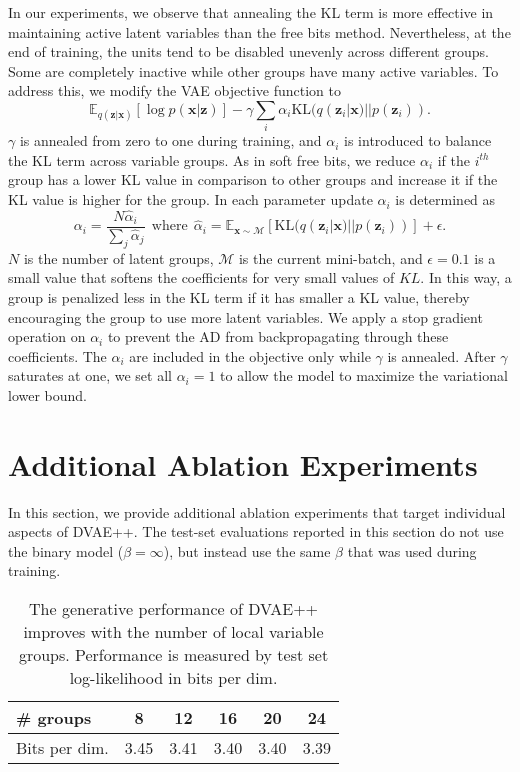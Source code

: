 \documentclass{article}
\newcommand{\x}{{\pmb{x}}}
\newcommand{\z}{{\pmb{z}}}
\newcommand{\E}{{\mathbb{E}}}
\def\KL{\text{KL}}
\begin{document}
In our experiments, we observe that annealing the KL term is more effective in maintaining active latent
variables than the free bits method. Nevertheless, at the end of training, the units tend to be
disabled unevenly across different groups. Some are completely inactive while other groups have many active variables. To address this, 
we modify the VAE objective function to
\begin{equation*}
\E_{q(\z|\x)}\left[ \log p(\x|\z)  \right] - \gamma \sum_i \alpha_i \KL(q(\z_{i}|\x) || p(\z_{i})).
\end{equation*}
$\gamma$ is annealed from zero to one during training, and $\alpha_i$ is introduced to balance the KL term across variable groups. 
As in soft free bits,
we reduce $\alpha_i$ if the $i^{th}$ group has a lower KL value in comparison to other groups and increase it if the KL value is higher for the group. 
In each parameter update $\alpha_i$ is determined as
\begin{equation*}
\alpha_i = \frac{N \hat{\alpha}_i}{\sum_j \hat{\alpha}_j} \ \ \text{where} \ \ \hat{\alpha}_i =  \E_{\x \sim \mathcal{M}} [\KL(q(\z_{i}|\x) || p(\z_{i}))] +\epsilon.
\end{equation*}
$N$ is the number of latent groups, $\mathcal{M}$ is the current mini-batch, and $\epsilon=0.1$ is a small value that softens the coefficients for very small values of $KL$. 
In this way, a group is penalized less in the KL term
if it has smaller a KL value, thereby encouraging the group to use more latent variables. We apply a stop gradient operation on $\alpha_i$ to prevent the AD from 
backpropagating through these coefficients. The $\alpha_i$ are included in the objective only while $\gamma$ is annealed. After $\gamma$  saturates at one, we set all $\alpha_i=1$ to allow the model to maximize the variational lower bound.  

\section{Additional Ablation Experiments}  \label{app:ablation}

In this section, we provide additional ablation experiments that target individual aspects of DVAE++. The test-set evaluations reported in this section do not use the binary model ($\beta=\infty$), but instead use the same $\beta$ that was used during training.
\begin{table} 
\centering
  \caption{The generative performance of DVAE++ improves with the number of local variable groups. 
  Performance is measured by test set log-likelihood in bits per dim.}
\begin{tabular}{ l|c|c|c|c|c}    \# groups              &  8 & 12 & 16 & 20 & 24 \\
\hline
Bits per dim.          & 3.45 & 3.41 & 3.40 & 3.40 &  3.39 \\
\end{tabular} \label{tab:num_layer_expr}
\end{table}
\end{document}
